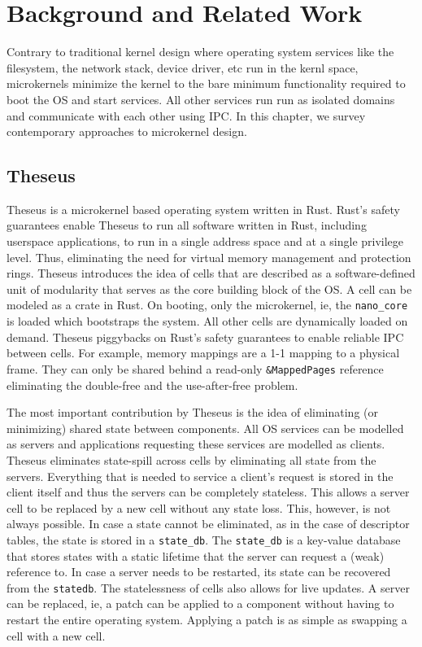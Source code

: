 
\chapter{Background and Related Work}

\label{Chapter2}

Contrary to traditional kernel design where operating system services like the filesystem, the network stack, device driver, etc run in the kernl space, microkernels minimize the kernel to the bare minimum functionality required to boot the OS and start services. All other services run run as isolated domains and communicate with each other using IPC. In this chapter, we survey contemporary approaches to microkernel design.
\section{Theseus}
Theseus\cite{theseus} is a microkernel based operating system written in Rust. Rust's safety guarantees enable Theseus to run all software written in Rust, including userspace applications, to run in a single address space and at a single privilege level. Thus, eliminating the need for virtual memory management and protection rings. Theseus introduces the idea of cells that are described as a software-defined unit of modularity that serves as the core building block of the OS. A cell can be modeled as a crate in Rust. On booting, only the microkernel, ie, the \lstinline{nano_core} is loaded which bootstraps the system. All other cells are dynamically loaded on demand. 
Theseus piggybacks on Rust's safety guarantees to enable reliable IPC between cells. For example, memory mappings are a 1-1 mapping to a physical frame. They can only be shared behind a read-only \lstinline{&MappedPages} reference eliminating the double-free and the use-after-free problem. 

The most important contribution by Theseus is the idea of eliminating (or minimizing) shared state between components. All OS services can be modelled as servers and applications requesting these services are modelled as clients. Theseus eliminates state-spill\cite{state-spill} across cells by eliminating all state from the servers. Everything that is needed to service a client's request is stored in the client itself and thus the servers can be completely stateless. This allows a server cell to be replaced by a new cell without any state loss. This, however, is not always possible. In case a state cannot be eliminated, as in the case of descriptor tables, the state is stored in a \lstinline{state_db}. The \lstinline{state_db} is a key-value database that stores states with a static lifetime that the server can request a (weak) reference to. In case a server needs to be restarted, its state can be recovered from the \lstinline{statedb}. The statelessness of cells also allows for live updates. A server can be replaced, ie, a patch can be applied to a component without having to restart the entire operating system. Applying a patch is as simple as swapping a cell with a new cell.

